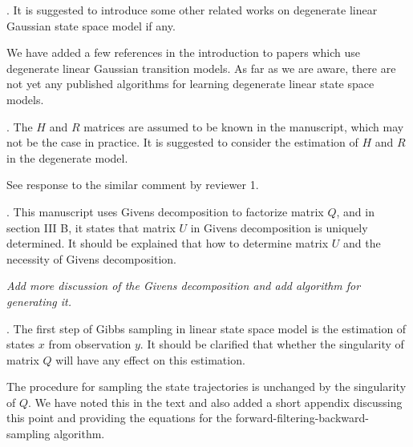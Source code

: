 \documentclass{article}
\newenvironment{review}[0]{\begin{itshape}\color{Gray}\noindent}{\end{itshape}\vspace{0.4cm}}
\newenvironment{response}[0]{\noindent}{\vspace{0.4cm}}
\newcommand{\meta}[1]{{\color{red}\em #1}}
\begin{document}
\begin{review}
2.  It is suggested to introduce some other related works on degenerate linear Gaussian state space model if any.
\end{review}

\begin{response}
 We have added a few references in the introduction to papers which use degenerate linear Gaussian transition models. As far as we are aware, there are not yet any published algorithms for learning degenerate linear state space models.
\end{response}

\begin{review}
3.  The $H$ and $R$ matrices are assumed to be known in the manuscript, which may not be the case in practice. It is suggested to consider the estimation of $H$ and $R$ in the degenerate model.
\end{review}

\begin{response}
 See response to the similar comment by reviewer 1.
\end{response}

\begin{review}
4.  This manuscript uses Givens decomposition to factorize matrix $Q$, and in section III B, it states that matrix $U$ in Givens decomposition is uniquely determined. It should be explained that how to determine matrix $U$ and the necessity of Givens decomposition.
\end{review}

\begin{response}
 \meta{Add more discussion of the Givens decomposition and add algorithm for generating it.}
\end{response}

\begin{review}
5.   The first step of Gibbs sampling in linear state space model is the estimation of states $x$ from observation $y$. It should be clarified that whether the singularity of matrix $Q$ will have any effect on this estimation. 
\end{review}

\begin{response}
 The procedure for sampling the state trajectories is unchanged by the singularity of $Q$. We have noted this in the text and also added a short appendix discussing this point and providing the equations for the forward-filtering-backward-sampling algorithm.
\end{response}
\end{document}
